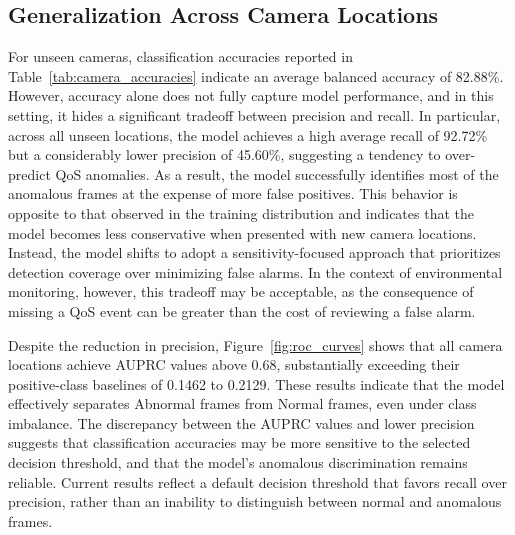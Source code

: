 \documentclass[remotesensing,article,submit,moreauthors]{Definitions/mdpi}
\begin{document}
\subsection{Generalization Across Camera Locations}

For unseen cameras, classification accuracies reported in Table~\ref{tab:camera_accuracies} indicate an average balanced accuracy of 82.88\%. However, accuracy alone does not fully capture model performance, and in this setting, it hides a significant tradeoff between precision and recall. In particular, across all unseen locations, the model achieves a high average recall of 92.72\% but a considerably lower precision of 45.60\%, suggesting a tendency to over-predict \ac{QoS} anomalies. As a result, the model successfully identifies most of the anomalous frames at the expense of more false positives. This behavior is opposite to that observed in the training distribution and indicates that the model becomes less conservative when presented with new camera locations. Instead, the model shifts to adopt a sensitivity-focused approach that prioritizes detection coverage over minimizing false alarms. In the context of environmental monitoring, however, this tradeoff may be acceptable, as the consequence of missing a \ac{QoS} event can be greater than the cost of reviewing a false alarm. 

Despite the reduction in precision, Figure~\ref{fig:roc_curves} shows that all camera locations achieve \ac{AUPRC} values above 0.68, substantially exceeding their positive-class baselines of 0.1462 to 0.2129. These results indicate that the model effectively separates Abnormal frames from Normal frames, even under class imbalance. The discrepancy between the \ac{AUPRC} values and lower precision suggests that classification accuracies may be more sensitive to the selected decision threshold, and that the model's anomalous discrimination remains reliable. Current results reflect a default decision threshold that favors recall over precision, rather than an inability to distinguish between normal and anomalous frames. 
\end{document}
